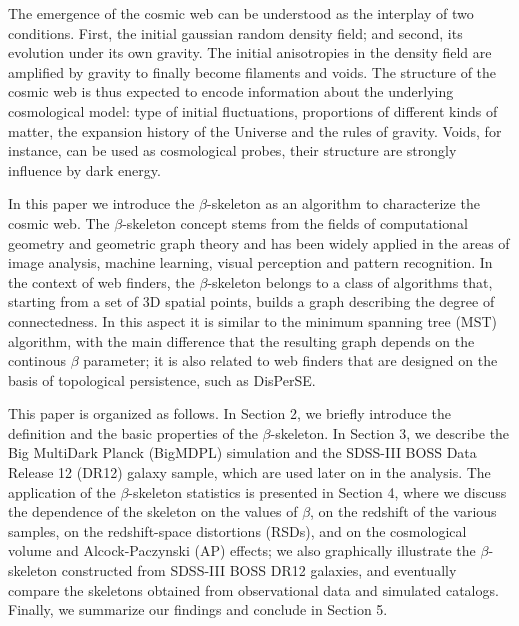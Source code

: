 \documentclass[useAMS,usenatbib]{mnras}
\begin{document}
The emergence of the cosmic web can be understood as the interplay of
two conditions. First, the initial gaussian random density field; and
second, its evolution under its own gravity. 
The initial anisotropies in the density field are amplified by gravity
to finally become filaments and voids.  
The structure of the cosmic web is thus expected to encode information
about the underlying cosmological model: type of initial fluctuations,
proportions of different kinds of matter, the expansion history of the
Universe and the rules of gravity.
Voids, for instance, can be used as cosmological probes, their
structure are strongly influence by dark energy.

In this paper we introduce the $\beta$-skeleton as an algorithm to
characterize the cosmic web.
The $\beta$-skeleton concept stems from the fields of computational geometry
and geometric graph theory and has been widely applied in the areas of
image analysis, machine learning, visual perception and pattern
recognition. 
In the context of web finders, the $\beta$-skeleton belongs to a class
of algorithms that, starting from a set of 3D spatial points, builds a
graph describing the degree of connectedness.
In this aspect it is similar to the minimum spanning tree (MST)
algorithm, with the main difference that the resulting graph depends
on the continous $\beta$ parameter;
it is also related to web finders that are designed on the basis of
topological persistence, such as DisPerSE. 





This paper is organized as follows. 
In Section 2, we briefly introduce the definition and the basic properties of the $\beta$-skeleton. 
In Section 3, we describe the Big MultiDark Planck (BigMDPL) simulation and the SDSS-III BOSS Data Release 12 (DR12) galaxy sample, which are used later on in the analysis. 
The application of the $\beta$-skeleton statistics is presented in Section 4, 
where we discuss the dependence of the skeleton on the values of $\beta$, 
on the redshift of the various samples, on the redshift-space distortions (RSDs), and on the cosmological volume and Alcock-Paczynski (AP) effects; 
we also graphically illustrate the $\beta$-skeleton constructed from SDSS-III BOSS DR12 galaxies,
and eventually compare the skeletons obtained from observational data and simulated catalogs.  
Finally, we summarize our findings and conclude in Section 5. 


\cite{2017A&A...600A.125C}


 
\end{document}
